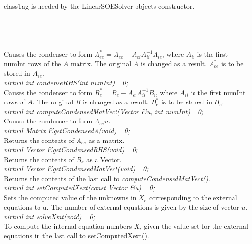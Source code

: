   \\
  \\
\p classTag is needed by the LinearSOESolver objects constructor. \\

 \\
\\ 

  \\
 \\
Causes the condenser to form $A_{ee}^* = A_{ee} -A_{ei} A_{ii}^{-1} A_{ie}$, where
$A_{ii}$ is the first \p numInt rows of the $A$ matrix.  The
original $A$ is changed as a result. $A_{ee}^*$ is to be stored in $A_{ee}$. \\

{\em virtual int condenseRHS(int numInt) =0;} \\
Causes the condenser to form $B_e^* = B_e - A_{ei} A_{ii}^{-1} B_i$, where $A_{ii}$ 
is the first \p numInt rows of $A$. The original $B$ is changed as a result. 
$B_e^*$ is to be stored in $B_e$. \\

{\em virtual int computeCondensedMatVect(Vector \&u, int numInt) =0;} \\
Causes the condenser to form $A_{ee} u$. \\

{\em virtual Matrix \&getCondensedA(void) =0;} \\
Returns the contents of $A_{ee}$ as a matrix. \\

{\em virtual Vector \&getCondensedRHS(void) =0;} \\
Returns the contents of $B_e$ as a Vector. \\

{\em virtual Vector \&getCondensedMatVect(void) =0;} \\
Returns the contents of the last call to {\em
computeCondensedMatVect()}. \\

{\em virtual int setComputedXext(const Vector \&u) =0;} \\
Sets the computed value of the unknowns in $X_e$ corresponding to the
external equations to \p u. The number of external equations is
given by the size of vector $u$.\\

{\em  virtual int solveXint(void) =0;} \\
To compute the internal equation numbers $X_i$ given the value set
for the external equations in the last call to setComputedXext(). \\

